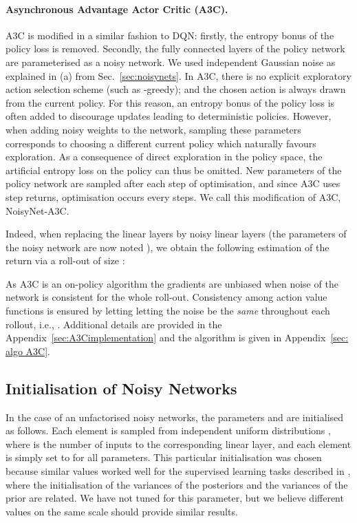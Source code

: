 \documentclass{article}
\newcommand{\algoinit}{NoisyNet}
\begin{document}
\paragraph{Asynchronous Advantage Actor Critic (A3C).}
A3C is modified in a similar fashion to DQN: firstly, the entropy bonus of the policy loss is removed.
Secondly, the fully connected layers of the policy network are parameterised as a noisy network. We used independent Gaussian noise as explained in (a) from Sec.~\ref{sec:noisynets}.
In A3C, there is no explicit exploratory action selection scheme (such as -greedy); and the chosen action is always drawn from the current policy. For this reason, an entropy bonus of the policy loss is often added to discourage updates leading to deterministic policies. However, when adding noisy weights to the network, sampling these parameters corresponds to choosing a different current policy which naturally favours exploration.
As a consequence of direct exploration in the policy space, the artificial entropy loss on the policy can thus be omitted. New parameters of the policy network are sampled after each step of optimisation, and since A3C uses  step returns, optimisation occurs every  steps. We call this modification of A3C, \algoinit{}-A3C.


Indeed, when replacing the linear layers by noisy linear layers (the parameters of the noisy network are now noted ), we obtain the following estimation of the return via a roll-out of size :

As A3C is an on-policy algorithm the gradients are unbiased when noise of the network is consistent for the whole roll-out.
Consistency among action value functions  is ensured by letting letting the noise be the \emph{same} throughout each rollout, i.e., .
Additional details are provided in the Appendix~\ref{sec:A3Cimplementation} and the algorithm is given in Appendix~\ref{sec: algo A3C}.

\subsection{Initialisation of Noisy Networks}

In the case of an unfactorised noisy networks, the parameters  and  are initialised as follows.
Each element  is sampled from independent uniform distributions , where  is the number of inputs to the corresponding linear layer, and each element  is simply set to  for all parameters. This particular initialisation was chosen because similar values worked well for the supervised learning tasks described in \cite{fortunato2017bayesian}, where the initialisation of the variances of the posteriors and the variances of the prior are related. We have not tuned for this parameter, but we believe different values on the same scale should provide similar results.
\end{document}
